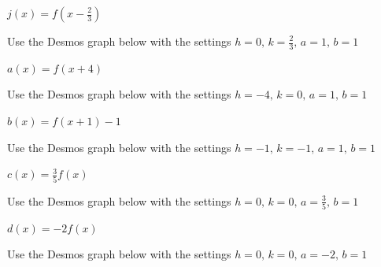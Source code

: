 \documentclass{ximera}
\begin{document}
\begin{question}
\begin{problem}
$j(x) = f\left(x - \frac{2}{3}\right)$

\begin{solution}
Use the Desmos graph below with the settings $h=0,\,k=\frac{2}{3},\,a=1,\,b=1$

\begin{center} 
\end{center}
\end{solution} 
\end{problem}


\begin{problem}
$a(x) = f(x + 4)$

\begin{solution}
Use the Desmos graph below with the settings $h=-4,\,k=0,\,a=1,\,b=1$

\begin{center} 
\end{center}
\end{solution} 
\end{problem}

\begin{problem}
$b(x) = f(x + 1) - 1$

\begin{solution}
Use the Desmos graph below with the settings $h=-1,\,k=-1,\,a=1,\,b=1$

\begin{center} 
\end{center}
\end{solution} 
\end{problem}

\begin{problem}
$c(x) = \frac{3}{5}f(x)$

\begin{solution}
Use the Desmos graph below with the settings $h=0,\,k=0,\,a=\frac{3}{5},\,b=1$

\begin{center} 
\end{center}
\end{solution} 
\end{problem}

\begin{problem}
$d(x) = -2f(x)$

\begin{solution}
Use the Desmos graph below with the settings $h=0,\,k=0,\,a=-2,\,b=1$


\end{solution}
\end{problem}
\end{question}
\end{document}
